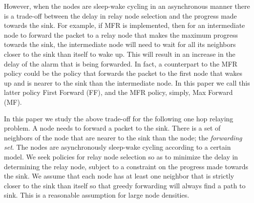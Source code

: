 \documentclass[onecolumn]{IEEEtran}
\begin{document}
However, when the nodes are sleep-wake cycling in an asynchronous
manner there is a trade-off between the delay in relay node selection
and the progress made towards the sink. For example, if MFR is
implemented, then for an intermediate node to forward the packet to a
relay node that makes the maximum progress towards the sink, the
intermediate node will need to wait for all its neighbors closer to
the sink than itself to wake up. This will result in an increase in
the delay of the alarm that is being forwarded. In fact, a counterpart
to the MFR policy could be the policy that forwards the packet to the
first node that wakes up and is nearer to the sink than the
intermediate node. In this paper we call this latter policy First
Forward (FF), and the MFR policy, simply, Max Forward (MF).

In this paper we study the above trade-off for the following one hop
relaying problem. A node needs to forward a packet to the sink. There
is a set of neighbors of the node that are nearer to the sink than the
node; the \emph{forwarding set}. The nodes are asynchronously
sleep-wake cycling according to a certain model. We seek policies for
relay node selection so as to minimize the delay in determining the
relay node, subject to a constraint on the progress made towards the
sink. We assume that each node has at least one neighbor that is strictly
closer to the sink than itself so that greedy forwarding will always
find a path to sink.  This is a reasonable assumption for large node
densities.
\end{document}
